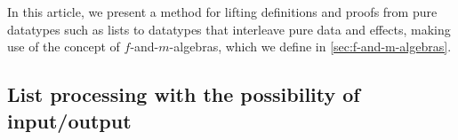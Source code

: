 In this article, we present a method for lifting definitions and
proofs from pure datatypes such as lists to datatypes that interleave
pure data and effects, making use of the concept of
$f$-and-$m$-algebras, which we define in
\autoref{sec:f-and-m-algebras}.




\subsection{List processing with the possibility of input/output}

